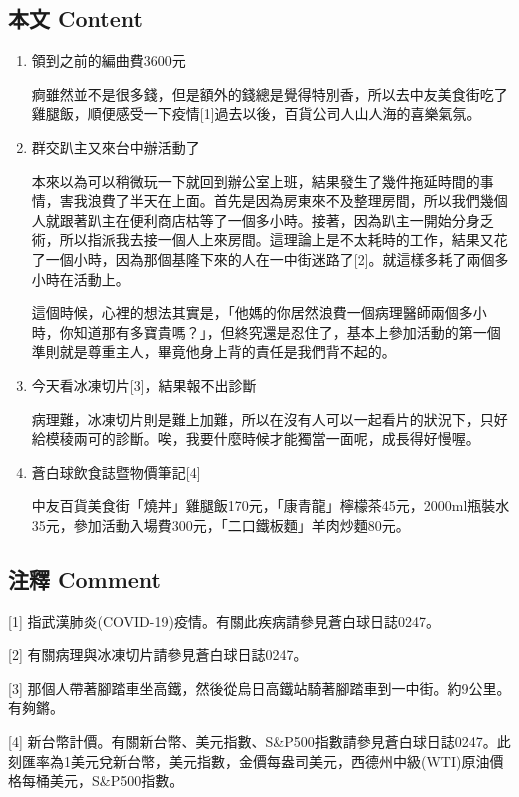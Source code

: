 \documentclass[
]{article}
\begin{document}
\hypertarget{ux672cux6587-content-16}{%
\subsection{本文 Content}\label{ux672cux6587-content-16}}

\begin{enumerate}
\def\labelenumi{\arabic{enumi}.}
\item
  領到之前的編曲費3600元

  痾雖然並不是很多錢，但是額外的錢總是覺得特別香，所以去中友美食街吃了雞腿飯，順便感受一下疫情{[}1{]}過去以後，百貨公司人山人海的喜樂氣氛。
\item
  群交趴主又來台中辦活動了

  本來以為可以稍微玩一下就回到辦公室上班，結果發生了幾件拖延時間的事情，害我浪費了半天在上面。首先是因為房東來不及整理房間，所以我們幾個人就跟著趴主在便利商店枯等了一個多小時。接著，因為趴主一開始分身乏術，所以指派我去接一個人上來房間。這理論上是不太耗時的工作，結果又花了一個小時，因為那個基隆下來的人在一中街迷路了{[}2{]}。就這樣多耗了兩個多小時在活動上。

  這個時候，心裡的想法其實是，「他媽的你居然浪費一個病理醫師兩個多小時，你知道那有多寶貴嗎？」，但終究還是忍住了，基本上參加活動的第一個準則就是尊重主人，畢竟他身上背的責任是我們背不起的。
\item
  今天看冰凍切片{[}3{]}，結果報不出診斷

  病理難，冰凍切片則是難上加難，所以在沒有人可以一起看片的狀況下，只好給模稜兩可的診斷。唉，我要什麼時候才能獨當一面呢，成長得好慢喔。
\item
  蒼白球飲食誌暨物價筆記{[}4{]}

  中友百貨美食街「燒丼」雞腿飯170元，「康青龍」檸檬茶45元，2000ml瓶裝水35元，參加活動入場費300元，「二口鐵板麵」羊肉炒麵80元。
\end{enumerate}

\hypertarget{ux6ce8ux91cb-comment-16}{%
\subsection{注釋 Comment}\label{ux6ce8ux91cb-comment-16}}

{[}1{]} 指武漢肺炎(COVID-19)疫情。有關此疾病請參見蒼白球日誌0247。

{[}2{]} 有關病理與冰凍切片請參見蒼白球日誌0247。

{[}3{]}
那個人帶著腳踏車坐高鐵，然後從烏日高鐵站騎著腳踏車到一中街。約9公里。有夠鏘。

{[}4{]}
新台幣計價。有關新台幣、美元指數、S\&P500指數請參見蒼白球日誌0247。此刻匯率為1美元兌新台幣，美元指數，金價每盎司美元，西德州中級(WTI)原油價格每桶美元，S\&P500指數。
\end{document}
